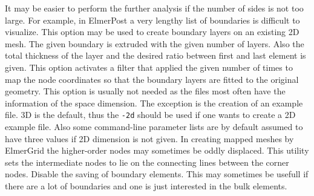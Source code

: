 It may be easier to perform the further analysis if the number of sides is not too large.
For example, in ElmerPost a very lengthy list of boundaries is difficult to visualize.
%
This option may be used to create boundary layers on an existing 2D mesh.
The given boundary is extruded with the given number of layers. Also the total
thickness of the layer and the desired ratio between first and last element
is given.
%
This option activates a filter that applied the given number of times
to map the node coordinates 
so that the boundary layers are fitted to the original geometry.
%
This option is usually not needed as the files most often have the information
of the space dimension. The exception is the creation of an example file.
3D is the default, thus the \texttt{-2d} should be used if one wants to create
a 2D example file. Also some command-line parameter lists are by default assumed to have 
three values if 2D dimension is not given.
%
In creating mapped meshes by ElmerGrid the higher-order nodes may sometimes be 
oddly displaced. This utility sets the intermediate nodes to lie on the connecting lines
between the corner nodes. 
%
Disable the saving of boundary elements.
This may sometimes be usefull if there are a lot of boundaries and one is just interested 
in the bulk elements.

%
%
\sifend


